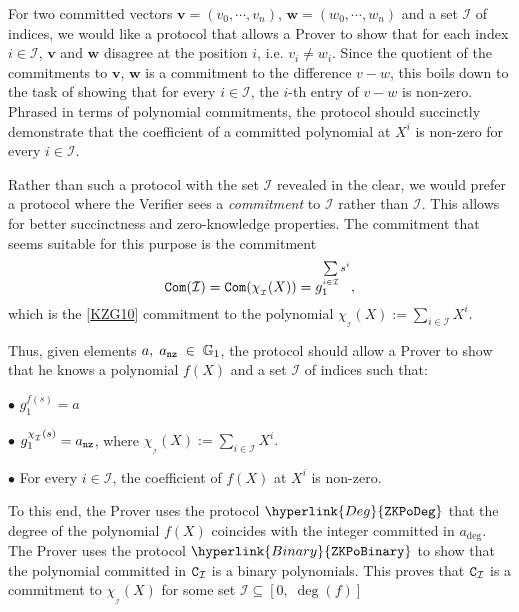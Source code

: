 \documentclass[11pt, lettersize, notitlepage, leqno, footskip=0.6cm]{article}
\newcommand{\mc}{\mathcal}
\newcommand{\mb}{\mathbb}
\newcommand{\mbf}{\mathbf}
\newcommand{\ov}{\overline}
\newcommand{\sub}{\subseteq}
\newcommand{\vs}{\vspace{-0.15cm}}
\newcommand{\noin}{\noindent}
\numberwithin{equation}{section}
\begin{document}
For two committed vectors $\mbf{v} = (v_0,\cdots,v_n)$, $\mbf{w} = (w_0,\cdots,w_n)$ and a set $\mc{I}$ of indices, we would like a protocol that allows a Prover to show that for each index $i\in \mc{I}$, $\mbf{v}$ and $\mbf{w}$ disagree at the position $i$, i.e. $v_i\neq w_i$. Since the quotient of the commitments to $\mbf{v}$, $\mbf{w}$ is a commitment to the difference $v-w$, this boils down to the task of showing that for every $i\in \mc{I}$, the $i$-th entry of $v-w$ is non-zero. Phrased in terms of polynomial commitments, the protocol should succinctly demonstrate that the coefficient of a committed polynomial at $X^i$ is non-zero for every $i\in \mc{I}$.

Rather than such a protocol with the set $\mc{I}$ revealed in the clear, we would prefer a protocol where the Verifier sees a \textit{commitment} to $\mc{I}$ rather than $\mc{I}$. This allows for better succinctness and zero-knowledge properties. The commitment that seems suitable for this purpose is the commitment \vs $$ {\tt{Com}}(\mc{I}) = {\tt{Com}}(\chi_{_\mc{I}}(X)) = g_1^{\sum\limits_{i\in \mc{I}} s^i},       $$ which is the [\hyperlink{KZG}{\hyperlink{KZG}{\hyperlink{KZG}{KZG10}}}] commitment to the polynomial $\chi_{_\mc{I}}(X):= \sum\limits_{i\in \mc{I}} X^i$.

Thus, given elements $a,\; a_{\tt{nz}}\;\in\; \mb{G}_1$, the protocol should allow a Prover to show that he knows a polynomial $f(X)$ and a set $\mc{I}$ of indices such that: \vspace{2mm}

\noin $\bullet$ $g_1^{f(s)} = a$ \vspace{1mm}

\noin $\bullet$ $g_1^{\chi_{_\mc{I}}(s)} =a_{\tt{nz}}$, where $\chi_{_\mc{I}}(X):= \sum\limits_{i\in \mc{I}} X^i. $ \vspace{1mm}

\noin $\bullet$ For every $i\in \mc{I}$, the coefficient of $f(X)$ at $X^i$ is non-zero. \vspace{2mm}



To this end, the Prover uses the protocol $\hyperlink{Deg}{\tt{ZKPoDeg}}$ that the degree of the polynomial $f(X)$ coincides with the integer committed in $a_{\deg}$. The Prover uses the protocol $\hyperlink{Binary}{\tt{ZKPoBinary}}$ to show that the polynomial committed in ${{\tt{C}}_{\mc{I}}}$ is a binary polynomials. This proves that ${{\tt{C}}_{\mc{I}}}$ is a commitment to $\chi_{_\mc{I}}(X)$ for some set $\mc{I}\sub [0,\;\deg(f)]$
\end{document}
